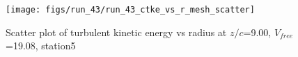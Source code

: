 \begin{figure}[H]
\centering
\texttt{[image: figs/run\_43/run\_43\_ctke\_vs\_r\_mesh\_scatter]}
\caption{Scatter plot of turbulent kinetic energy vs radius at $z/c$=9.00, $V_{free}$=19.08, station5}
\label{fig:run_43_ctke_vs_r_mesh_scatter}
\end{figure}


